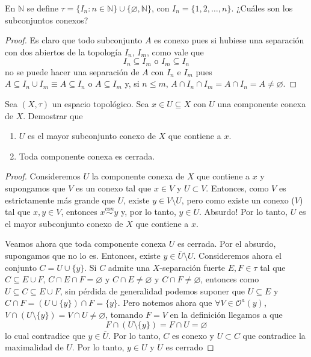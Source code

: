 \documentclass{article}
\theoremstyle{definition}
\newcommand{\N}{\mathbb{N}}
\newcommand{\cl}[1]{\overline{#1}}              %
\newenvironment{ejercicio}[1]{\begin{trivlist}
\item[\hskip \labelsep {\bfseries Ejercicio}\hskip \labelsep {\bfseries #1.}]}{\end{trivlist}}
\begin{document}
\begin{ejercicio}{7}
    En \( \N \) se define \( \tau = \{ I_n : n \in \N \} \cup \{ \varnothing, \N \} \), con \( I_n = \{ 1, 2, \ldots, n \} \). ¿Cuáles son los subconjuntos conexos?
\end{ejercicio}
\begin{proof}
    Es claro que todo subconjunto \( A \) es conexo pues si hubiese una separación con dos abiertos de la topología \( I_n \), \( I_m \), como vale que \[
        I_n \subseteq I_m \text{ o } I_m \subseteq I_n
    \]
    no se puede hacer una separación de \( A \) con \( I_n \) e \( I_m \) pues \( A \subseteq I_n \cup I_m \equiv A \subseteq I_n \text{ o } A \subseteq I_m \) y, si \( n \leq m \), \( A \cap I_n \cap I_m = A \cap I_n = A \neq \varnothing \).
\end{proof}

\begin{ejercicio}{8}
    Sea \((X, \tau)\) un espacio topológico. Sea \( x \in U \subseteq X \) con \(U\) una componente conexa de \(X\). Demostrar que
    \begin{enumerate}
        \item \(U\) es el mayor subconjunto conexo de \(X\) que contiene a \(x\).
        \item Toda componente conexa es cerrada.
    \end{enumerate}
\end{ejercicio}
\begin{proof}
    Consideremos \( U \) la componente conexa de \( X \) que contiene a \( x \) y supongamos que \( V \) es un conexo tal que \( x \in V \) y
    \( U \subset V \). Entonces, como \( V \) es estrictamente más grande que \( U \), existe \( y \in V \setminus U \), pero como existe
    un conexo (\(V\)) tal que \( x, y \in V \), entonces \( x \overset{con}{\sim} y \) y, por lo tanto, \( y \in U \). Absurdo! Por lo tanto, \( U \) es el mayor subconjunto conexo de \( X \) que contiene a \( x \).

    Veamos ahora que toda componente conexa \( U \) es cerrada. Por el absurdo, supongamos que no lo es. Entonces, existe \( y \in \cl{U} \setminus U \). Consideremos ahora
    el conjunto \( C = U \cup \{ y \} \). Si \( C \) admite una \( X \)-separación fuerte \( E, F \in \tau \) tal que \( C \subseteq E \cup F \),
    \( C \cap E \cap F = \varnothing \) y \( C \cap E \neq \varnothing \) y \( C \cap F \neq \varnothing \), entonces como \( U \subseteq C \subseteq E \cup F \),
    sin pérdida de generalidad podemos suponer que \( U \subseteq E \) y \( C \cap F = (U \cup \{ y \}) \cap F = \{ y \} \).
    Pero notemos ahora que \( \forall V \in \mathcal{O}^a(y) \), \( V \cap (U \setminus \{ y \}) = V \cap U \neq \varnothing \), tomando \( F = V \) en la definición llegamos a que \[
        F \cap (U \setminus \{ y \}) = F \cap U = \varnothing
    \]
    lo cual contradice que \( y \in \cl{U} \). Por lo tanto, \( C \) es conexo y \( U \subset C \) que contradice la maximalidad de \( U \). Por lo tanto, \( y \in U \) y \( U \) es cerrado
\end{proof}
\end{document}

